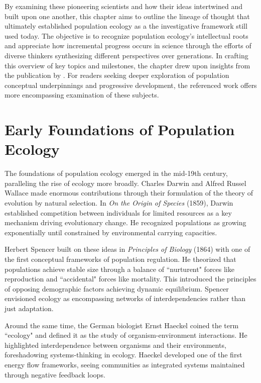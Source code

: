 By examining these pioneering scientists and how their ideas intertwined and built upon one another, this chapter aims to outline the lineage of thought that ultimately established population ecology as a the investigative framework still used today. The objective is to recognize population ecology's intellectual roots and appreciate how incremental progress occurs in science through the efforts of diverse thinkers synthesizing different perspectives over generations. In crafting this overview of key topics and milestones, the chapter drew upon insights from the publication by \cite{Mira1997}. For readers seeking deeper exploration of population conceptual underpinnings and progressive development, the referenced work offers more encompassing examination of these subjects.


\section{Early Foundations of Population Ecology}

The foundations of population ecology emerged in the mid-19th century, paralleling the rise of ecology more broadly. Charles Darwin and Alfred Russel Wallace made enormous contributions through their formulation of the theory of evolution by natural selection. In \emph{On the Origin of Species} (1859), Darwin established competition between individuals for limited resources as a key mechanism driving evolutionary change. He recognized populations as growing exponentially until constrained by environmental carrying capacities.

Herbert Spencer built on these ideas in \emph{Principles of Biology} (1864) with one of the first conceptual frameworks of population regulation. He theorized that populations achieve stable size through a balance of ``nurturent" forces like reproduction and ``accidental" forces like mortality. This introduced the principles of opposing demographic factors achieving dynamic equilibrium. Spencer envisioned ecology as encompassing networks of interdependencies rather than just adaptation.

Around the same time, the German biologist Ernst Haeckel coined the term ``ecology" and defined it as the study of organism-environment interactions. He highlighted interdependence between organisms and their environments, foreshadowing systems-thinking in ecology. Haeckel developed one of the first energy flow frameworks, seeing communities as integrated systems maintained through negative feedback loops.

